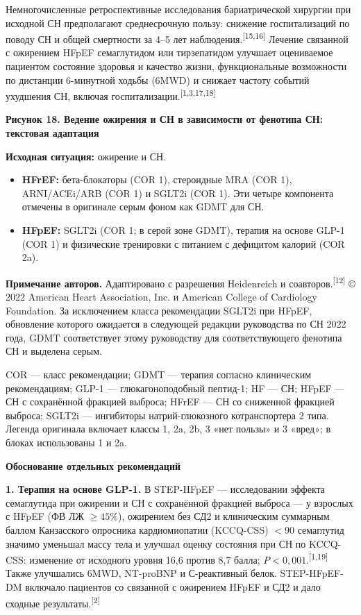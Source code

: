 \documentclass[11pt,a4paper]{article}
\newcommand{\src}[1]{\textsuperscript{[#1]}}
\newcommand{\heading}[1]{\par\medskip\textbf{#1}\par}
\begin{document}
Немногочисленные ретроспективные исследования бариатрической хирургии при исходной СН предполагают среднесрочную пользу: снижение госпитализаций по поводу СН и общей смертности за 4--5 лет наблюдения.\src{15,16} Лечение связанной с ожирением HFpEF семаглутидом или тирзепатидом улучшает оцениваемое пациентом состояние здоровья и качество жизни, функциональные возможности по дистанции 6-минутной ходьбы (6MWD) и снижает частоту событий ухудшения СН, включая госпитализации.\src{1,3,17,18}

\heading{Рисунок 18. Ведение ожирения и СН в зависимости от фенотипа СН: текстовая адаптация}
\textbf{Исходная ситуация:} ожирение и СН.
\begin{itemize}
\item \textbf{HFrEF:} бета-блокаторы (COR 1), стероидные MRA (COR 1), ARNI/ACEi/ARB (COR 1) и SGLT2i (COR 1). Эти четыре компонента отмечены в оригинале серым фоном как GDMT для СН.
\item \textbf{HFpEF:} SGLT2i (COR 1; в серой зоне GDMT), терапия на основе GLP-1 (COR 1) и физические тренировки с питанием с дефицитом калорий (COR 2a).
\end{itemize}
\textbf{Примечание авторов.} Адаптировано с разрешения Heidenreich и соавторов.\src{12} © 2022 American Heart Association, Inc. и American College of Cardiology Foundation. За исключением класса рекомендации SGLT2i при HFpEF, обновление которого ожидается в следующей редакции руководства по СН 2022 года, GDMT соответствует этому руководству для соответствующего фенотипа СН и выделена серым.

COR --- класс рекомендации; GDMT --- терапия согласно клиническим рекомендациям; GLP-1 --- глюкагоноподобный пептид-1; HF --- СН; HFpEF --- СН с сохранённой фракцией выброса; HFrEF --- СН со сниженной фракцией выброса; SGLT2i --- ингибиторы натрий-глюкозного котранспортера 2 типа. Легенда оригинала включает классы 1, 2a, 2b, 3 «нет пользы» и 3 «вред»; в блоках использованы 1 и 2a.

\heading{Обоснование отдельных рекомендаций}
\textbf{1. Терапия на основе GLP-1.} В STEP-HFpEF --- исследовании эффекта семаглутида при ожирении и СН с сохранённой фракцией выброса --- у взрослых с HFpEF (ФВ ЛЖ $\geq45\%$), ожирением без СД2 и клиническим суммарным баллом Канзасского опросника кардиомиопатии (KCCQ-CSS) $<90$ семаглутид значимо уменьшал массу тела и улучшал оценку состояния при СН по KCCQ-CSS: изменение от исходного уровня 16,6 против 8,7 балла; $P<0{,}001$.\src{1,19} Также улучшались 6MWD, NT-proBNP и С-реактивный белок. STEP-HFpEF-DM включало пациентов со связанной с ожирением HFpEF и СД2 и дало сходные результаты.\src{2}
\end{document}
